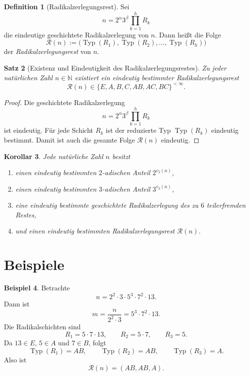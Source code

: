 \documentclass[11pt,a4paper]{article}
\newtheorem{satz}{Satz}
\newtheorem{korollar}[satz]{Korollar}
\theoremstyle{definition}
\newtheorem{definition}[satz]{Definition}
\newtheorem{beispiel}[satz]{Beispiel}
\theoremstyle{remark}
\newcommand{\N}{\mathbb{N}}
\newcommand{\Typ}{\operatorname{Typ}}
\newcommand{\Rest}{\mathcal{R}}
\begin{document}
	\begin{definition}[Radikalzerlegungsrest]
		Sei
		\[
		n=2^\alpha 3^\beta \prod_{k=1}^{h} R_k
		\]
		die eindeutige geschichtete Radikalzerlegung von \(n\). Dann heißt die Folge
		\[
		\Rest(n):=\bigl(\Typ(R_1),\Typ(R_2),\dots,\Typ(R_h)\bigr)
		\]
		der \emph{Radikalzerlegungsrest} von \(n\).
	\end{definition}
	
	\begin{satz}[Existenz und Eindeutigkeit des Radikalzerlegungsrestes]
		Zu jeder natürlichen Zahl \(n\in\N\) existiert ein eindeutig bestimmter Radikalzerlegungsrest
		\[
		\Rest(n)\in \{E,A,B,C,AB,AC,BC\}^{<\infty}.
		\]
	\end{satz}
	
	\begin{proof}
		Die geschichtete Radikalzerlegung
		\[
		n=2^\alpha 3^\beta \prod_{k=1}^{h} R_k
		\]
		ist eindeutig. Für jede Schicht \(R_k\) ist der reduzierte Typ \(\Typ(R_k)\) eindeutig bestimmt.
		Damit ist auch die gesamte Folge \(\Rest(n)\) eindeutig.
	\end{proof}
	
	\begin{korollar}
		Jede natürliche Zahl \(n\) besitzt
		\begin{enumerate}[label=(\roman*),itemsep=0.2em]
			\item einen eindeutig bestimmten \(2\)-adischen Anteil \(2^{v_2(n)}\),
			\item einen eindeutig bestimmten \(3\)-adischen Anteil \(3^{v_3(n)}\),
			\item eine eindeutig bestimmte geschichtete Radikalzerlegung des zu \(6\) teilerfremden Restes,
			\item und einen eindeutig bestimmten Radikalzerlegungsrest \(\Rest(n)\).
		\end{enumerate}
	\end{korollar}
	
	\section{Beispiele}
	
	\begin{beispiel}
		Betrachte
		\[
		n=2^2\cdot 3\cdot 5^3\cdot 7^2\cdot 13.
		\]
		Dann ist
		\[
		m=\frac{n}{2^2\cdot 3}=5^3\cdot 7^2\cdot 13.
		\]
		Die Radikalschichten sind
		\[
		R_1=5\cdot 7\cdot 13,\qquad R_2=5\cdot 7,\qquad R_3=5.
		\]
		Da \(13\in E\), \(5\in A\) und \(7\in B\), folgt
		\[
		\Typ(R_1)=AB,\qquad \Typ(R_2)=AB,\qquad \Typ(R_3)=A.
		\]
		Also ist
		\[
		\Rest(n)=(AB,AB,A).
		\]
	\end{beispiel}
	
\end{document}
